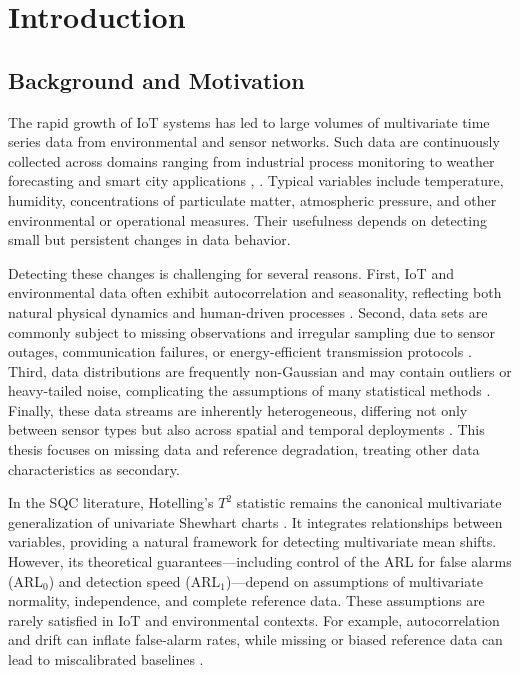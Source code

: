 \clearpage
\section{Introduction}

\subsection{Background and Motivation}
The rapid growth of \ac{IoT} systems has led to large volumes of multivariate time series data from environmental and sensor networks. Such data are continuously collected across domains ranging from industrial process monitoring to weather forecasting and smart city applications \cite{Cook2007}, \cite{Belay2023}. Typical variables include temperature, humidity, concentrations of particulate matter, atmospheric pressure, and other environmental or operational measures. Their usefulness depends on detecting small but persistent changes in data behavior.

Detecting these changes is challenging for several reasons. First, \ac{IoT} and environmental data often exhibit autocorrelation and seasonality, reflecting both natural physical dynamics and human-driven processes \cite{Wilks2011}. Second, data sets are commonly subject to missing observations and irregular sampling due to sensor outages, communication failures, or energy-efficient transmission protocols \cite{Yoon2019}. Third, data distributions are frequently non-Gaussian and may contain outliers or heavy-tailed noise, complicating the assumptions of many statistical methods \cite{Chandola2009}. Finally, these data streams are inherently heterogeneous, differing not only between sensor types but also across spatial and temporal deployments \cite{Ben2024}. This thesis focuses on missing data and reference degradation, treating other data characteristics as secondary.

In the \ac{SQC} literature, Hotelling’s $T^2$ statistic remains the canonical multivariate generalization of univariate Shewhart charts \cite{Sauter1992}. It integrates relationships between variables, providing a natural framework for detecting multivariate mean shifts. However, its theoretical guarantees—including control of the \ac{ARL} for false alarms (ARL$_0$) and detection speed (ARL$_1$)—depend on assumptions of multivariate normality, independence, and complete reference data. These assumptions are rarely satisfied in \ac{IoT} and environmental contexts. For example, autocorrelation and drift can inflate false-alarm rates, while missing or biased reference data can lead to miscalibrated baselines \cite{Venkatasubramanian2003}.

